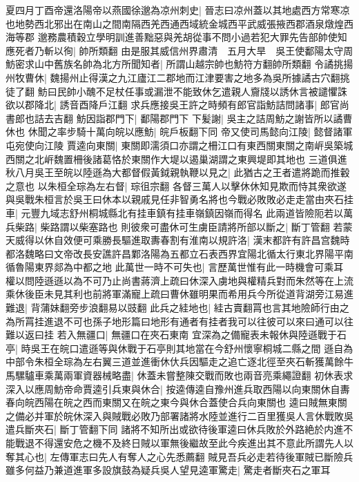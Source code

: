 夏四月丁酉帝還洛陽帝以燕國徐邈為凉州刺史|{
	晉志曰凉州蓋以其地處西方常寒凉也地勢西北邪出在南山之間南隔西羌西通西域統金城西平武威張掖西郡酒泉燉煌西海等郡}
邈務農積穀立學明訓進善黜惡與羌胡從事不問小過若犯大罪先告部帥使知應死者乃斬以徇|{
	帥所類翻}
由是服其威信州界肅清　五月大旱　吳王使鄱陽太守周魴密求山中舊族名帥為北方所聞知者|{
	所謂山越宗帥也魴符方翻帥所類翻}
令譎挑揚州牧曹休|{
	魏揚州止得漢之九江廬江二郡地而江津要害之地多為吳所據譎古穴翻挑徒了翻}
魴曰民帥小醜不足杖任事或漏泄不能致休乞遣親人齎牋以誘休言被譴懼誅欲以郡降北|{
	誘音酉降戶江翻}
求兵應接吳王許之時頻有郎官詣魴詰問諸事|{
	郎官尚書郎也詰去吉翻}
魴因詣郡門下|{
	鄱陽郡門下}
下髪謝|{
	吳主之詰周魴之謝皆所以譎曹休也}
休聞之率步騎十萬向皖以應魴|{
	皖戶板翻下同}
帝又使司馬懿向江陵|{
	懿督諸軍屯宛使向江陵}
賈逵向東關|{
	東關即濡須口亦謂之柵江口有東西關東關之南㟁吳築城西關之北㟁魏置柵後諸葛恪於東關作大堤以遏巢湖謂之東興堤即其地也}
三道俱進秋八月吳王至皖以陸遜為大都督假黃鉞親執鞭以見之|{
	此猶古之王者遣將跪而推轂之意也}
以朱桓全琮為左右督|{
	琮徂宗翻}
各督三萬人以擊休休知見欺而恃其衆欲遂與吳戰朱桓言於吳王曰休本以親戚見任非智勇名將也今戰必敗敗必走走當由夾石挂車|{
	元豐九域志舒州桐城縣北有挂車鎮有挂車嶺鎮因嶺而得名}
此兩道皆險阨若以萬兵柴路|{
	柴路謂以柴塞路也}
則彼衆可盡休可生虜臣請將所部以斷之|{
	斷丁管翻}
若蒙天威得以休自效便可乘勝長驅進取夀春割有淮南以規許洛|{
	漢末都許有許昌宫魏時都洛魏略曰文帝改長安譙許昌鄴洛陽為五都立石表西界宜陽北循太行東北界陽平南循魯陽東界郯為中都之地}
此萬世一時不可失也|{
	言歷萬世惟有此一時機會可乘耳}
權以問陸遜遜以為不可乃止尚書蔣濟上疏曰休深入虜地與權精兵對而朱然等在上流乘休後臣未見其利也前將軍滿寵上疏曰曹休雖明果而希用兵今所從道背湖旁江易進難退|{
	背蒲妹翻旁步浪翻易以豉翻}
此兵之絓地也|{
	絓古賣翻罥也言其地險師行由之為所罥挂進退不可也孫子地形篇曰地形有通者有挂者我可以往彼可以來曰通可以往難以返曰挂}
若入無疆口|{
	無疆口在夾石東南}
宜深為之備寵表未報休與陸遜戰于石亭|{
	時吳王在皖口遣遜等與休戰于石亭則其地當在今舒州懷寧桐城二縣之間}
遜自為中部令朱桓全琮為左右翼三道並進衝休㐲兵因驅走之追亡逐北徑至夾石斬獲萬餘牛馬騾驢車乘萬兩軍資器械略盡|{
	休蓋未嘗整陳交戰而敗也兩音亮乘繩證翻}
初休表求深入以應周魴帝命賈逵引兵東與休合|{
	按逵傳逵自豫州進兵取西陽以向東關休自夀春向皖西陽在皖之西而東關又在皖之東今與休合蓋使合兵向東關也}
逵曰賊無東關之備必并軍於皖休深入與賊戰必敗乃部署諸將水陸並進行二百里獲吳人言休戰敗吳遣兵斷夾石|{
	斷丁管翻下同}
諸將不知所出或欲待後軍逵曰休兵敗於外路絶於内進不能戰退不得還安危之機不及終日賊以軍無後繼故至此今疾進出其不意此所謂先人以奪其心也|{
	左傳軍志曰先人有奪人之心先悉薦翻}
賊見吾兵必走若待後軍賊已斷險兵雖多何益乃兼道進軍多設旗鼓為疑兵吳人望見逵軍驚走|{
	驚走者斷夾石之軍耳}
